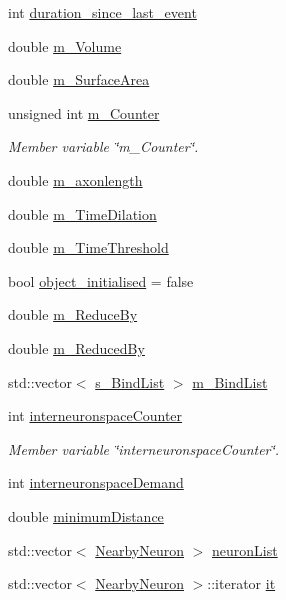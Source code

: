 \begin{DoxyCompactItemize}
\item 
int \mbox{\hyperlink{classInterneuronSpace_a7a5cfbb9b0a619283417044345b01578}{duration\+\_\+since\+\_\+last\+\_\+event}}
\item 
double \mbox{\hyperlink{classInterneuronSpace_aae1ef00c4fdc597fa12548771953b239}{m\+\_\+\+Volume}}
\item 
double \mbox{\hyperlink{classInterneuronSpace_a2cd3cbca541688d4eaf15fc6c8496dd1}{m\+\_\+\+Surface\+Area}}
\item 
unsigned int \mbox{\hyperlink{classInterneuronSpace_a854dc7cd9f9b8643b2c674d2eaa36873}{m\+\_\+\+Counter}}
\begin{DoxyCompactList}\small\item\em Member variable \char`\"{}m\+\_\+\+Counter\char`\"{}. \end{DoxyCompactList}\item 
double \mbox{\hyperlink{classInterneuronSpace_a97595972171f2fd0c37ad2d830f61fbb}{m\+\_\+axonlength}}
\item 
double \mbox{\hyperlink{classInterneuronSpace_a31182cce98aaecef1533fe17fc3e6786}{m\+\_\+\+Time\+Dilation}}
\item 
double \mbox{\hyperlink{classInterneuronSpace_a16272fc7502a95a69ca60cbe4612f100}{m\+\_\+\+Time\+Threshold}}
\item 
bool \mbox{\hyperlink{classInterneuronSpace_af16aec913a2ec7b4f92f7da2487b4b00}{object\+\_\+initialised}} = false
\item 
double \mbox{\hyperlink{classInterneuronSpace_a9cb8dd97e4c6c18d3b84e0c0db6ca605}{m\+\_\+\+Reduce\+By}}
\item 
double \mbox{\hyperlink{classInterneuronSpace_a848666191c3e8c746d5b7d82b1b8d329}{m\+\_\+\+Reduced\+By}}
\item 
std\+::vector$<$ \mbox{\hyperlink{structInterneuronSpace_1_1s__BindList}{s\+\_\+\+Bind\+List}} $>$ \mbox{\hyperlink{classInterneuronSpace_a37041f5f3a796a7dedcf4cb576c9dbcd}{m\+\_\+\+Bind\+List}}
\item 
int \mbox{\hyperlink{classInterneuronSpace_ae1196b764996aa441538d5f6909a2344}{interneuronspace\+Counter}}
\begin{DoxyCompactList}\small\item\em Member variable \char`\"{}interneuronspace\+Counter\char`\"{}. \end{DoxyCompactList}\item 
int \mbox{\hyperlink{classInterneuronSpace_a6b6f5ac9671c40ea57d39824e76a7ccd}{interneuronspace\+Demand}}
\item 
double \mbox{\hyperlink{classInterneuronSpace_a7656441e3758dae6167e49903a916bf6}{minimum\+Distance}}
\item 
std\+::vector$<$ \mbox{\hyperlink{structInterneuronSpace_1_1NearbyNeuron}{Nearby\+Neuron}} $>$ \mbox{\hyperlink{classInterneuronSpace_ac55f2a154e8abc403ac1459f0317f0cf}{neuron\+List}}
\item 
std\+::vector$<$ \mbox{\hyperlink{structInterneuronSpace_1_1NearbyNeuron}{Nearby\+Neuron}} $>$\+::iterator \mbox{\hyperlink{classInterneuronSpace_a9643f76d9b5acf91152ed69f6c3dca49}{it}}
\end{DoxyCompactItemize}

